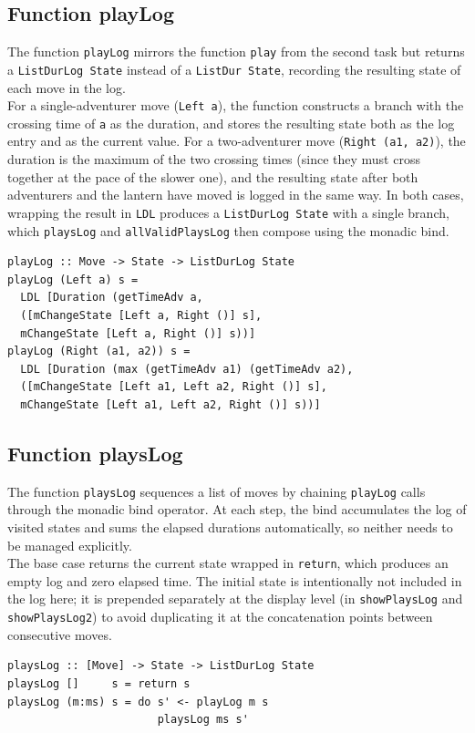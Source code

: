 \documentclass[a4paper,12pt]{report}
\begin{document}
\subsection{Function playLog}
The function \texttt{playLog} mirrors the function \texttt{play} from the second task
but returns a \texttt{ListDurLog State} instead of a \texttt{ListDur State}, recording
the resulting state of each move in the log.
\\[1em]
For a single-adventurer move (\texttt{Left a}), the function constructs a branch
with the crossing time of \texttt{a} as the duration, and stores the resulting state
both as the log entry and as the current value. For a two-adventurer move
(\texttt{Right (a1, a2)}), the duration is the maximum of the two crossing times
(since they must cross together at the pace of the slower one), and the resulting
state after both adventurers and the lantern have moved is logged in the same way.
In both cases, wrapping the result in \texttt{LDL} produces a \texttt{ListDurLog State}
with a single branch, which \texttt{playsLog} and \texttt{allValidPlaysLog} then compose
using the monadic bind.
\begin{verbatim}
playLog :: Move -> State -> ListDurLog State
playLog (Left a) s =
  LDL [Duration (getTimeAdv a,
  ([mChangeState [Left a, Right ()] s],
  mChangeState [Left a, Right ()] s))]
playLog (Right (a1, a2)) s =
  LDL [Duration (max (getTimeAdv a1) (getTimeAdv a2),
  ([mChangeState [Left a1, Left a2, Right ()] s],
  mChangeState [Left a1, Left a2, Right ()] s))]
\end{verbatim}
\subsection{Function playsLog}
The function \texttt{playsLog} sequences a list of moves by chaining \texttt{playLog}
calls through the monadic bind operator. At each step, the bind accumulates the log
of visited states and sums the elapsed durations automatically, so neither needs to be
managed explicitly.
\\[1em]
The base case returns the current state wrapped in \texttt{return}, which produces an
empty log and zero elapsed time. The initial state is intentionally not included in the
log here; it is prepended separately at the display level (in \texttt{showPlaysLog} and
\texttt{showPlaysLog2}) to avoid duplicating it at the concatenation points between
consecutive moves.
\begin{verbatim}
playsLog :: [Move] -> State -> ListDurLog State
playsLog []     s = return s
playsLog (m:ms) s = do s' <- playLog m s
                       playsLog ms s'
\end{verbatim}
\end{document}
